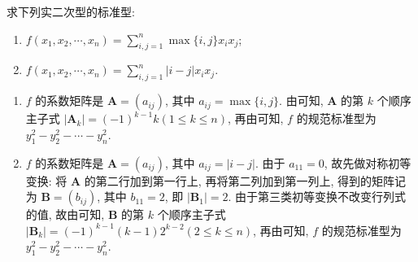 \documentclass[../../main.tex]{subfiles}
\begin{document}
\begin{example}
求下列实二次型的标准型:
\begin{enumerate}
\item \(f(x_1,x_2,\cdots,x_n)=\sum_{i,j = 1}^{n}\max\{i,j\}x_ix_j\);
\item \(f(x_1,x_2,\cdots,x_n)=\sum_{i,j = 1}^{n}|i - j|x_ix_j\).
\end{enumerate}
\end{example}
\begin{solution}
\begin{enumerate}
\item \(f\) 的系数矩阵是 \(\boldsymbol{A}=(a_{ij})\), 其中 \(a_{ij}=\max\{i,j\}\). 由可知, \(\boldsymbol{A}\) 的第 \(k\) 个顺序主子式 \(|\boldsymbol{A}_k|=(-1)^{k - 1}k(1\leqslant  k\leqslant  n)\), 再由可知, \(f\) 的规范标准型为 \(y_1^2 - y_2^2 - \cdots - y_n^2\).
\item \(f\) 的系数矩阵是 \(\boldsymbol{A}=(a_{ij})\), 其中 \(a_{ij}=|i - j|\). 由于 \(a_{11}=0\), 故先做对称初等变换: 将 \(\boldsymbol{A}\) 的第二行加到第一行上, 再将第二列加到第一列上, 得到的矩阵记为 \(\boldsymbol{B}=(b_{ij})\), 其中 \(b_{11}=2\), 即 \(|\boldsymbol{B}_1| = 2\). 由于第三类初等变换不改变行列式的值, 故由可知, \(\boldsymbol{B}\) 的第 \(k\) 个顺序主子式 \(|\boldsymbol{B}_k|=(-1)^{k - 1}(k - 1)2^{k - 2}(2\leqslant  k\leqslant  n)\), 再由可知, \(f\) 的规范标准型为 \(y_1^2 - y_2^2 - \cdots - y_n^2\). 
\end{enumerate} 

\end{solution}
\end{document}
